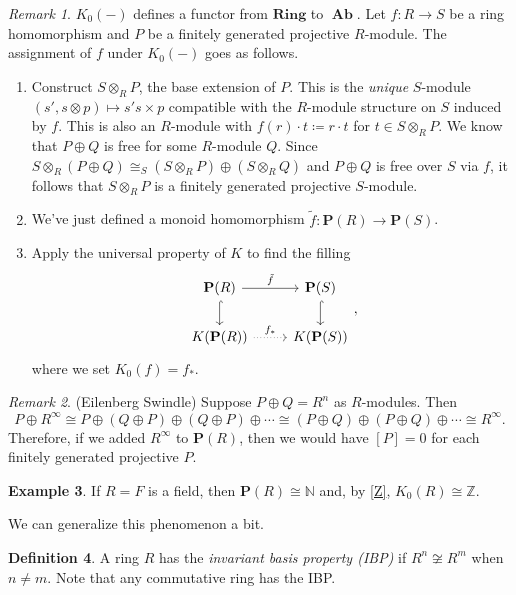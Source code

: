 \documentclass[10pt,letterpaper,cm]{nupset}
\theoremstyle{definition}
\newtheorem{definition}{Definition}
\newtheorem{exmp}[definition]{Example}
\theoremstyle{theorem}
\theoremstyle{remark}
\newtheorem{remark}[definition]{Remark}
\newcommand{\N}{\mathbb N}
\renewcommand{\P}{\mathbf P}
\newcommand{\Z}{\mathbb Z}
\newcommand{\1}{\mathbf{1}}
\newcommand{\0}{\vec 0}
\DeclareMathOperator{\Ab}{\mathbf{Ab}}
\begin{document}
\begin{remark}
$K_0(-)$ defines a functor from $\mathbf{Ring}$ to $\Ab$. Let $f: R \to S$ be a ring homomorphism and $P$ be a finitely generated projective $R$-module. The assignment of $f$ under $K_0(-)$ goes as follows.
\begin{enumerate}
\item Construct $S\otimes_R P$, the base extension of $P$. This is the \textit{unique} $S$-module $(s', s \otimes p) \mapsto  s's \times p$ compatible with the $R$-module structure on $S$ induced by $f$. This is also an $R$-module with $f(r) \cdot t \coloneqq r\cdot t$ for $t\in S \otimes_R P$. We know that $P \oplus Q$ is free for some $R$-module $Q$. Since $S\otimes_R (P \oplus Q) \cong_S (S \otimes_R P)\oplus (S \otimes_R Q)$ and $P\oplus Q$ is free over $S$ via $f$, it follows that  $S \otimes_R P$ is a finitely generated projective $S$-module.
\item We've just defined a monoid homomorphism $\tilde{f} : \P(R) \to \P(S)$.
\item Apply the universal property of $K$ to find the filling 
\[
\begin{tikzcd}
\mathbf{P}(R) \arrow[d, hook] \arrow[r, "\tilde{f}"] & \mathbf{P}(S) \arrow[d, hook] \\
K(\mathbf{P}(R)) \arrow[r, "f_{\ast}", dotted] & K(\mathbf{P}(S))
\end{tikzcd},
\]
where we set $K_0(f) = f_{\ast}$.
\end{enumerate}
\end{remark}

\begin{remark}{(Eilenberg Swindle)}
Suppose $P \oplus Q =R^n$ as $R$-modules. Then $$P \oplus R^{\infty} \cong P \oplus  (Q \oplus P) \oplus (Q \oplus P) \oplus \cdots \cong (P \oplus Q) \oplus (P \oplus Q) \oplus \cdots \cong R^{\infty}.$$
Therefore, if we added $R^{\infty}$ to $\P(R)$, then we would have $[P] = 0$ for each finitely generated projective $P$.
\end{remark}

\begin{exmp}
If $R =F$ is a field, then $\P(R) \cong \N$ and, by \cref{Z}, $K_0(R) \cong \Z$. 

We can generalize this phenomenon a bit.
\end{exmp}

\begin{definition}
A ring $R$ has the \textit{invariant basis property (IBP)} if $R^n \not \cong R^m$ when $n \ne m$. Note that any commutative ring has the IBP.
\end{definition}
\end{document}
